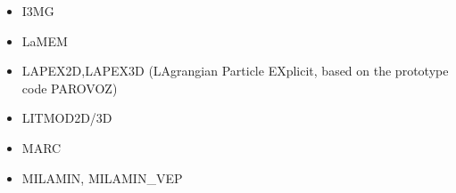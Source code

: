 \begin{itemize}
\item I3MG

{\small
\noindent
\cite{facc14}
}

\item LaMEM 

\begin{scriptsize}
\cite{scbe08}
\cite{kamm10}
\cite{lemk11}
\cite{may12}
\cite{lesh14}\cite{cokm14}\cite{bakp14}\cite{feka14a}\cite{feka14b}
\cite{puka15}\cite{feka15}\cite{cofk15}
\cite{kapb16}\cite{coyc16}
\cite{pukp18}
\cite{eitp19}\cite{hooi19}\cite{pust19}
\cite{eitf20}\cite{spsk20}\cite{pust20}
\end{scriptsize}

\item LAPEX2D,LAPEX3D  (LAgrangian Particle EXplicit, based on the prototype code PAROVOZ) 

\begin{scriptsize}
\cite{sopg05}\cite{baso05}\cite{soba05}
\cite{bbeg06}\cite{basv06}\cite{sobk06}\cite{peso06}
\cite{peso08}\cite{baso08}\cite{scbe08}
\cite{sosk11}
\end{scriptsize}

\item LITMOD2D/3D

{\small 
\noindent
\cite{afrf07}
\cite{affr08}
\cite{fuac09}
\cite{fufa10}
\cite{jitf19}
}

\item MARC

{\small
\noindent
\cite{nesg97}
\cite{nesb99}
}


\item {\codefont MILAMIN, MILAMIN\_VEP} 


\end{itemize}
